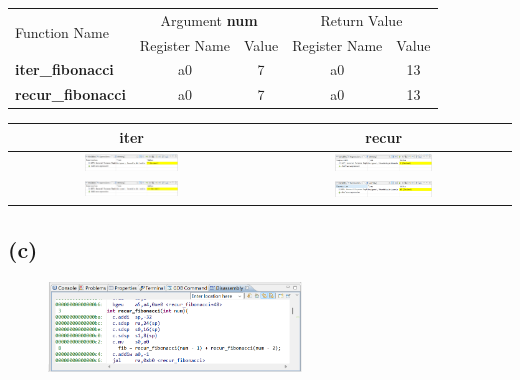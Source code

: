 \documentclass[12pt]{article}
\begin{document}
\begin{table}[H]
    \centering
    \begin{tabular}{|l|c|c|c|c|}
    \hline
    \multirow{2}{*}{Function Name} & \multicolumn{2}{c|}{Argument \textbf{num}} & \multicolumn{2}{c|}{Return Value} \\
    \cline{2-5}
    & Register Name & Value & Register Name & Value \\
    \hline
    \textbf{iter\_fibonacci} & a0 & 7 & a0 & 13 \\
    \hline
    \textbf{recur\_fibonacci} & a0 & 7 & a0 & 13 \\
    \hline
    \end{tabular}
\end{table}

\begin{table}[H]
    \centering
    \begin{tabular}{|c|c|}
    \hline
    \textbf{iter} & \textbf{recur} \\
    \hline
    \includegraphics[width=0.4\textwidth]{img/iter_argument.png} & \includegraphics[width=0.4\textwidth]{img/recur_argument.png} \\
    \hline
    \includegraphics[width=0.4\textwidth]{img/iter_return.png} & \includegraphics[width=0.4\textwidth]{img/recur_return.png} \\
    \hline
    \end{tabular}
\end{table}

\subsection*{(c)}

\begin{figure}[H]
    \centering
    \includegraphics[width=0.6\textwidth]{img/stack_layout.png}
\end{figure}
\end{document}

